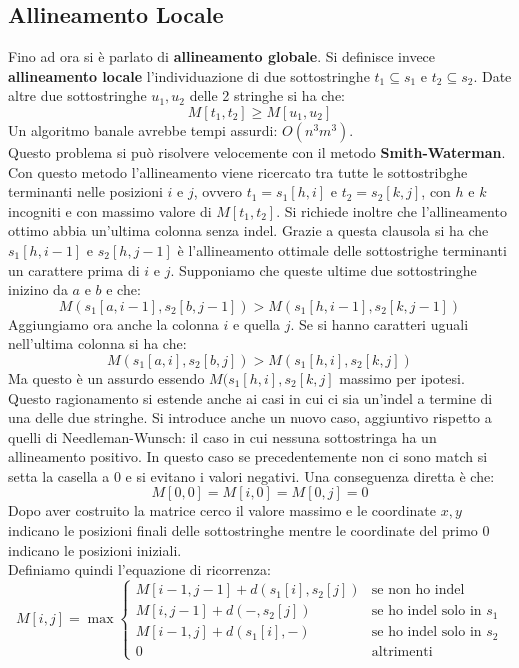 \documentclass[a4paper,12pt, oneside]{book}
\begin{document}
\subsection{Allineamento Locale}
Fino ad ora si è parlato di \textbf{allineamento globale}. Si
definisce invece \textbf{allineamento locale} l'individuazione di due
sottostringhe $t_1\subseteq s_1$ e $t_2\subseteq s_2$. Date altre due
sottostringhe $u_1,u_2$ delle 2 stringhe si ha che:
\[M[t_1,t_2]\geq M[u_1,u_2]\]
Un algoritmo banale avrebbe tempi assurdi: $O(n^3m^3)$.\\
Questo problema si può risolvere velocemente con il metodo
\textbf{Smith-Waterman}.\\
Con questo metodo l'allineamento viene ricercato tra tutte le
sottostribghe terminanti nelle posizioni $i$ e $j$, ovvero
$t_1=s_1[h,i]$ e $t_2=s_2[k,j]$, con $h$ e $k$ incogniti e con massimo
valore di $M[t_1,t_2]$. Si richiede inoltre che l'allineamento
ottimo abbia un'ultima colonna senza indel. Grazie a questa clausola
si ha che $s_1[h,i-1]$ e $s_2[h,j-1]$ è l'allineamento ottimale delle
sottostrighe terminanti un carattere prima di $i$ e $j$. Supponiamo
che queste ultime due sottostringhe inizino da $a$ e $b$ e che:
\[M(s_1[a,i-1],s_2[b,j-1])>M(s_1[h,i-1],s_2[k,j-1])\]
Aggiungiamo ora anche la colonna $i$ e quella $j$. Se si hanno
caratteri uguali nell'ultima colonna si ha che:
\[M(s_1[a,i],s_2[b,j])>M(s_1[h,i],s_2[k,j])\]
Ma questo è un assurdo essendo $M(s_1[h,i],s_2[k,j]$ massimo per
ipotesi.\\
Questo ragionamento si estende anche ai casi in cui ci sia un'indel a
termine di una delle due stringhe. Si introduce anche un nuovo caso,
aggiuntivo rispetto a quelli di Needleman-Wunsch: il caso in cui
nessuna sottostringa ha un allineamento positivo. In questo caso se
precedentemente non ci sono match si setta la casella a 0 e si evitano
i valori negativi. Una conseguenza diretta è che:
\[M[0,0]=M[i,0]=M[0,j]=0\]
Dopo aver costruito la matrice cerco il valore massimo e le coordinate
$x,y$ indicano le posizioni finali delle sottostringhe mentre le
coordinate del primo 0 indicano le posizioni iniziali.\\
Definiamo quindi l'equazione di ricorrenza:
\[M[i,j]=\max
  \begin{cases}
    M[i-1,j-1]+d(s_1[i],s_2[j]) & \mbox{se non ho indel}\\
    M[i,j-1]+d(-,s_2[j]) & \mbox{se ho indel solo in }s_1\\
    M[i-1,j]+d(s_1[i],-) & \mbox{se ho indel solo in }s_2\\
    0 & \mbox{altrimenti}
  \end{cases}
\]
\end{document}
